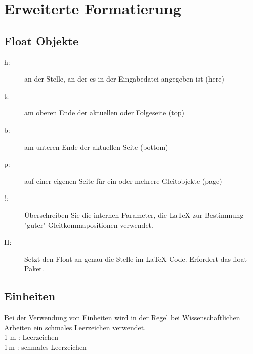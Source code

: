 \chapter{Erweiterte Formatierung}

\section{Float Objekte}

\begin{description}
	\item[h:] an der Stelle, an der es in der Eingabedatei angegeben ist (here)
	\item[t:] am oberen Ende der aktuellen oder Folgeseite (top)
	\item[b:] am unteren Ende der aktuellen Seite (bottom)
	\item[p:] auf einer eigenen Seite für ein oder mehrere Gleitobjekte (page)
	\item[!:] Überschreiben Sie die internen Parameter, die LaTeX zur Bestimmung "guter" Gleitkommapositionen verwendet.
	\item[H:] Setzt den Float an genau die Stelle im LaTeX-Code. Erfordert das float-Paket.
\end{description}

\section{Einheiten}
Bei der Verwendung von Einheiten wird in der Regel bei Wissenschaftlichen Arbeiten ein schmales Leerzeichen verwendet.\\
1 m : Leerzeichen \\
1\,m : schmales Leerzeichen \\